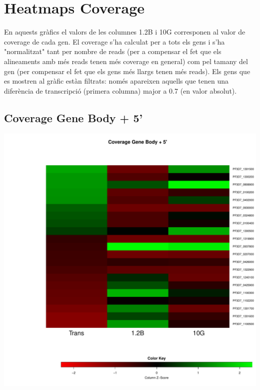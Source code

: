 \documentclass{article}\usepackage[]{graphicx}\usepackage[]{color}
\newenvironment{knitrout}{}{} %
\begin{document}
\clearpage
\section{Heatmaps Coverage}
En aquests gràfics el valors de les columnes 1.2B i 10G corresponen al valor de coverage de cada gen. El coverage s'ha calculat per a tots els gens i s'ha "normalitzat" tant per nombre de reads (per a compensar el fet que els alineaments amb més reads tenen més coverage en general) com pel tamany del gen (per compensar el fet que els gens més llargs tenen més reads). Els gens que es mostren al gràfic estàn filtrats: només apareixen aquells que tenen una diferència de transcripció (primera columna) major a 0.7 (en valor absolut).

\subsection{Coverage Gene Body + 5'}
\begin{knitrout}
\color{fgcolor}

{\centering \includegraphics[width=.9\linewidth]{figure/minimal-heat_cov_tss_gene-1} 

}



\end{knitrout}
\clearpage
\end{document}
